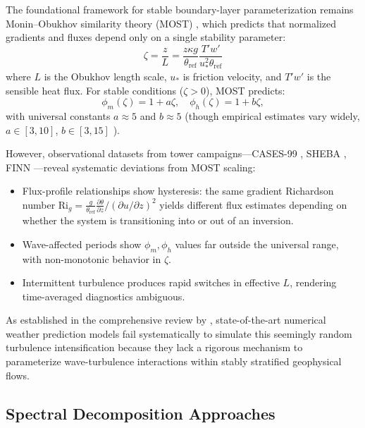 \documentclass[11pt,a4paper]{article}
\begin{document}
The foundational framework for stable boundary-layer parameterization remains Monin--Obukhov similarity theory (MOST) \citep{Obukhov1946, Paulson1970}, which predicts that normalized gradients and fluxes depend only on a single stability parameter:
\begin{equation}
\zeta = \frac{z}{L} = \frac{z \kappa g}{\theta_{\mathrm{ref}}} \frac{T'w'}{u_*^2 \theta_{\mathrm{ref}}}
\label{eq:zeta}
\end{equation}
where $L$ is the Obukhov length scale, $u_*$ is friction velocity, and $T'w'$ is the sensible heat flux. For stable conditions ($\zeta > 0$), MOST predicts:
\begin{equation}
\phi_m(\zeta) = 1 + a\zeta, \quad \phi_h(\zeta) = 1 + b\zeta,
\end{equation}
with universal constants $a \approx 5$ and $b \approx 5$ (though empirical estimates vary widely, $a \in [3, 10]$, $b \in [3, 15]$ \citep{Dyer1974, Högström1988}).

However, observational datasets from tower campaigns---CASES-99 \citep{Poulos2002}, SHEBA \citep{Uttal2002}, FINN \citep{Mahrt2013}---reveal systematic deviations from MOST scaling:
\begin{itemize}
  \item Flux-profile relationships show hysteresis: the same gradient Richardson number $\mathrm{Ri}_g = \frac{g}{\theta_{\mathrm{ref}}} \frac{\partial \theta}{\partial z} / (\partial u / \partial z)^2$ yields different flux estimates depending on whether the system is transitioning into or out of an inversion.
  \item Wave-affected periods show $\phi_m, \phi_h$ values far outside the universal range, with non-monotonic behavior in $\zeta$.
  \item Intermittent turbulence produces rapid switches in effective $L$, rendering time-averaged diagnostics ambiguous.
\end{itemize}

As established in the comprehensive review by \citet{Sun2015}, state-of-the-art numerical weather prediction models fail systematically to simulate this seemingly random turbulence intensification because they lack a rigorous mechanism to parameterize wave-turbulence interactions within stably stratified geophysical flows.

\subsection{Spectral Decomposition Approaches}
\end{document}
